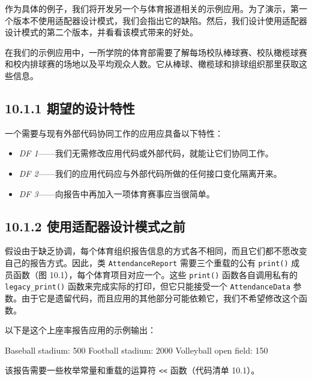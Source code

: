 作为具体的例子，我们将开发另一个与体育报道相关的示例应用。为了演示，第一个版本不使用适配器设计模式，我们会指出它的缺陷。然后，我们设计使用适配器设计模式的第二个版本，并看看该模式带来的好处。

在我们的示例应用中，一所学院的体育部需要了解每场校队棒球赛、校队橄榄球赛和校内排球赛的场地以及平均观众人数。它从棒球、橄榄球和排球组织那里获取这些信息。

\subsection{10.1.1 期望的设计特性}

一个需要与现有外部代码协同工作的应用应具备以下特性：

\begin{itemize}
\item \emph{DF 1}——我们无需修改应用代码或外部代码，就能让它们协同工作。
\item \emph{DF 2}——我们的应用代码应与外部代码所做的任何接口变化隔离开来。
\item \emph{DF 3}——向报告中再加入一项体育赛事应当很简单。
\end{itemize}

\subsection{10.1.2 使用适配器设计模式之前}

假设由于缺乏协调，每个体育组织报告信息的方式各不相同，而且它们都不愿改变自己的报告方式。因此，类 \texttt{Attendance\allowbreak{}Report} 需要三个重载的公有 \texttt{print()} 成员函数（图 10.1），每个体育项目对应一个。这些 \texttt{print()} 函数各自调用私有的 \texttt{legacy\_\allowbreak{}print(\allowbreak{})\allowbreak{}} 函数来完成实际的打印，但它只能接受一个 \texttt{Attendance\allowbreak{}Data} 参数。由于它是遗留代码，而且应用的其他部分可能依赖它，我们不希望修改这个函数。

以下是这个上座率报告应用的示例输出：

\begin{codebox}
Baseball
  stadium: 500
Football
  stadium: 2000
Volleyball
  open field: 150
\end{codebox}

该报告需要一些枚举常量和重载的运算符 \texttt{<<} 函数（代码清单 10.1）。


